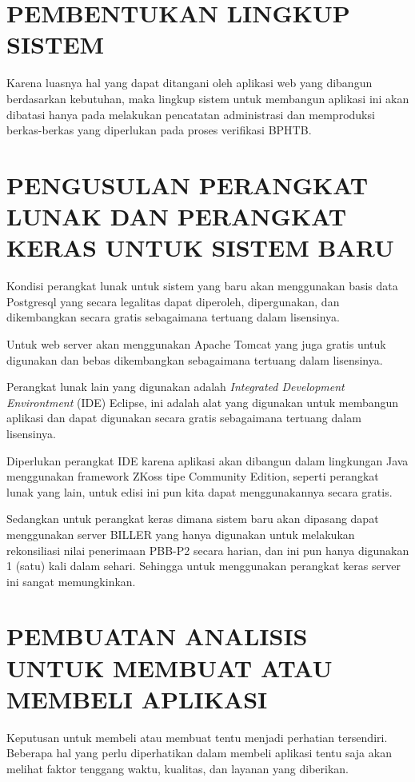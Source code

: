 \documentclass[pdftex,12pt, oneside]{article}
\begin{document}
\section{PEMBENTUKAN LINGKUP SISTEM}

Karena luasnya hal yang dapat ditangani oleh aplikasi web yang dibangun berdasarkan kebutuhan, maka lingkup sistem untuk membangun aplikasi ini akan dibatasi hanya pada melakukan pencatatan administrasi dan memproduksi berkas-berkas yang diperlukan pada proses verifikasi BPHTB.

\section{PENGUSULAN PERANGKAT LUNAK DAN PERANGKAT KERAS UNTUK SISTEM BARU}

Kondisi perangkat lunak untuk sistem yang baru akan menggunakan basis data Postgresql yang secara legalitas dapat diperoleh, dipergunakan, dan dikembangkan secara gratis sebagaimana tertuang dalam lisensinya.

Untuk web server akan menggunakan Apache Tomcat yang juga gratis untuk digunakan dan bebas dikembangkan sebagaimana tertuang dalam lisensinya.

Perangkat lunak lain yang digunakan adalah \textit{Integrated Development Environtment} (IDE) Eclipse, ini adalah alat yang digunakan untuk membangun aplikasi dan dapat digunakan secara gratis sebagaimana tertuang dalam lisensinya.

Diperlukan perangkat IDE karena aplikasi akan dibangun dalam lingkungan Java menggunakan framework ZKoss tipe Community Edition, seperti perangkat lunak yang lain, untuk edisi ini pun kita dapat menggunakannya secara gratis.

Sedangkan untuk perangkat keras dimana sistem baru akan dipasang dapat menggunakan server BILLER yang hanya digunakan untuk melakukan rekonsiliasi nilai penerimaan PBB-P2 secara harian, dan ini pun hanya digunakan 1 (satu) kali dalam sehari. Sehingga untuk menggunakan perangkat keras server ini sangat memungkinkan.

\section{PEMBUATAN ANALISIS UNTUK MEMBUAT ATAU MEMBELI APLIKASI}

Keputusan untuk membeli atau membuat tentu menjadi perhatian tersendiri. Beberapa hal yang perlu diperhatikan dalam membeli aplikasi tentu saja akan melihat faktor tenggang waktu, kualitas, dan layanan yang diberikan. 
\end{document}
